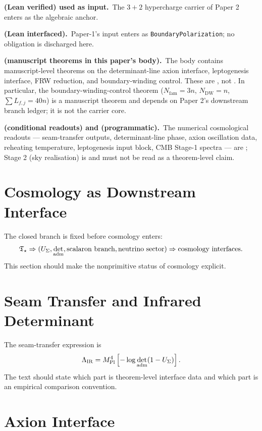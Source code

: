 \documentclass[11pt,a4paper]{article}
\begin{document}
\begin{tfptstatusbox}
\textbf{ (Lean verified) used as input.}\ The $3+2$
hypercharge carrier of Paper 2 enters as the algebraic anchor.

\smallskip
\textbf{ (Lean interfaced).}\ Paper-1's input enters
as \texttt{BoundaryPolarization}; no  obligation is
discharged here.

\smallskip
\textbf{ (manuscript theorems in this paper's body).}\
The body contains manuscript-level theorems on the
determinant-line axion interface, leptogenesis interface,
FRW reduction, and boundary-winding control. These are
, not . In particular, the
boundary-winding-control theorem
($N_{\mathrm{fam}} = 3n$, $N_{\mathrm{DW}} = n$,
$\sum L_{f,j} = 40n$) is a manuscript theorem and depends on
Paper 2's  downstream branch ledger; it is not the
 carrier core.

\smallskip
\textbf{ (conditional readouts) and 
(programmatic).}\ The numerical cosmological readouts ---
seam-transfer outputs, determinant-line phase, axion
oscillation data, reheating temperature, leptogenesis input
block, CMB Stage-1 spectra --- are ; Stage 2 (sky
realisation) is  and must not be read as a
theorem-level claim.
\end{tfptstatusbox}

\tableofcontents

\section{Cosmology as Downstream Interface}

The closed branch is fixed before cosmology enters:
\[
\mathfrak T_{\star}
\Rightarrow
(U_\Sigma,\det_{\mathrm{adm}},\text{scalaron branch},\text{neutrino sector})
\Rightarrow
\text{cosmology interfaces}.
\]
This section should make the nonprimitive status of cosmology explicit.

\section{Seam Transfer and Infrared Determinant}

The seam-transfer expression is
\[
\Lambda_{\mathrm{IR}}
=
M_{\mathrm{Pl}}^4\left[-\log\det_{\mathrm{adm}}(1-U_\Sigma)\right].
\]
The text should state which part is theorem-level interface data and which part is an empirical
comparison convention.

\section{Axion Interface}
\end{document}
